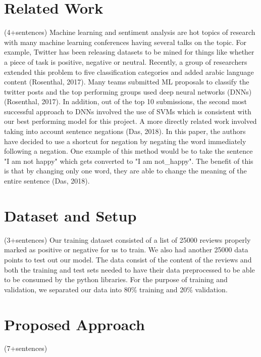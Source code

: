 \documentclass{amsart}
\theoremstyle{definition}
\theoremstyle{remark}
\numberwithin{equation}{section}
\begin{document}
\section{Related Work}(4+sentences)
Machine learning and sentiment analysis are hot topics of research with many machine learning conferences having several talks on the topic.  For example, Twitter has been releasing datasets to be mined for things like whether a piece of task is positive, negative or neutral.  Recently, a group of researchers extended this problem to five classification categories and added arabic language content (Rosenthal, 2017).  Many teams submitted ML proposals to classify the twitter posts and the top performing groups used deep neural networks (DNNs) (Rosenthal, 2017).  In addition, out of the top 10 submissions, the second most successful approach to DNNs involved the use of SVMs which is consistent with our best performing model for this project.  A more directly related work involved taking into account sentence negations (Das, 2018).  In this paper, the authors have decided to use a shortcut for negation by negating the word immediately following a negation.  One example of this method would be to take the sentence "I am not happy" which gets converted to "I am not\_happy".  The benefit of this is that by changing only one word, they are able to change the meaning of the entire sentence (Das, 2018).
\section{Dataset and Setup}(3+sentences)
Our training dataset consisted of a list of 25000 reviews properly marked as positive or negative for us to train.  We also had another 25000 data points to test out our model.  The data consist of the content of the reviews and both the training and test sets needed to have their data preprocessed to be able to be consumed by the python libraries.  For the purpose of training and validation, we separated our data into 80\% training and 20\% validation.
\section{Proposed Approach}(7+sentences)
\end{document}
